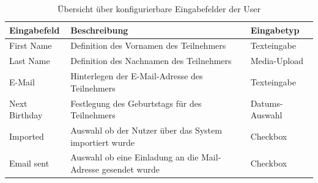\documentclass[
	ngerman,
	BCOR=8mm,
	headings=normal,
	parskip=half,
	headsepline,
	automark,
	listof=totoc,
	bibliography=totoc,
]{scrreprt}
\begin{document}
\begin{table}[h]
    \centering
    \renewcommand{\arraystretch}{1.3}
    \begin{tabular}{|p{3cm}|p{6cm}|p{5cm}|}
        \hline
        \textbf{Eingabefeld} & \textbf{Beschreibung} & \textbf{Eingabetyp} \\
        \hline
        First Name & Definition des Vornamen des Teilnehmers & Texteingabe \\
        \hline
        Last Name & Definition des Nachnamen des Teilnehmers & Media-Upload \\
        \hline
        E-Mail & Hinterlegen der E-Mail-Adresse des Teilnehmers & Texteingabe \\
        \hline
        Next Birthday & Festlegung des Geburtstags für des Teilnehmers  & Datums-Auswahl\\
        \hline
        Imported & Auswahl ob der Nutzer über das System importiert wurde & Checkbox \\
        \hline
        Email sent & Auswahl ob eine Einladung an die Mail-Adresse gesendet wurde  & Checkbox \\
        \hline
    \end{tabular}
    \caption{Übersicht über konfigurierbare Eingabefelder der User}
    \label{tab:eingabefelder_users}
\end{table}
\end{document}
